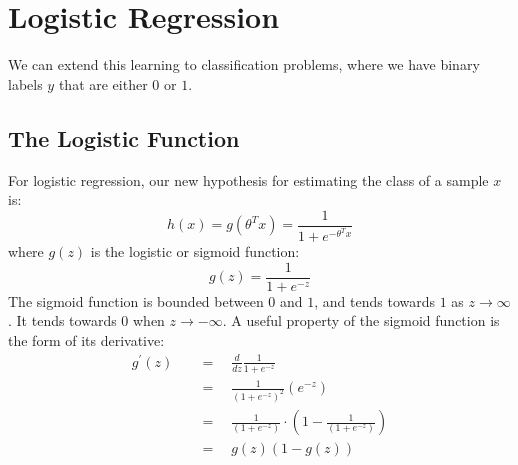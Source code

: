 \documentclass[twoside,twocolumn]{article}
\begin{document}
\section{Logistic Regression}
We can extend this learning to classification problems, where we have binary
labels $y$ that are either $0$ or $1$.
\subsection{The Logistic Function}
For logistic regression, our new hypothesis for estimating the class of a
sample $x$ is:
\begin{equation}
  h( x ) = g \left( \theta ^ { T } x \right) = \frac { 1 } { 1 + e ^ { - \theta ^ { T } x } }
\end{equation}
where $g(z)$ is the logistic or sigmoid function:
\begin{equation}
  g ( z ) = \frac { 1 } { 1 + e ^ { - z } }
\end{equation}
The sigmoid function is bounded between $0$ and $1$, and tends towards $1$ as
$z \rightarrow \infty$. It tends towards $0$ when $z \rightarrow -\infty$.
A useful property of the sigmoid function is the form of its derivative:
\begin{equation}
  \begin{aligned} g ^ { \prime } ( z ) \quad & = \quad \frac { d } { d z } \frac { 1 } { 1 + e ^ { - z } } \\
    & = \quad \frac { 1 } { \left( 1 + e ^ { - z } \right) ^ { 2 } } \left( e ^ { - z } \right) \\
    & = \quad \frac { 1 } { \left( 1 + e ^ { - z } \right) } \cdot \left( 1 - \frac { 1 } { \left( 1 + e ^ { - z } \right) } \right) \\
    & = \quad g ( z ) ( 1 - g ( z ) )
  \end{aligned}
\end{equation}
\end{document}
